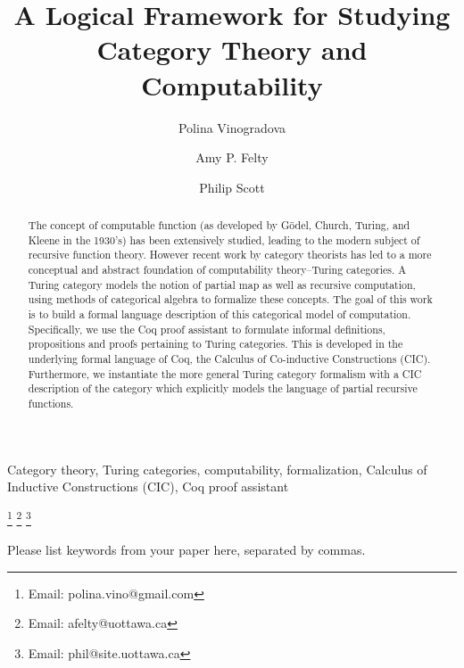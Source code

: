 \documentclass{entcs} \usepackage{entcsmacro}
\begin{document}
	\begin{frontmatter}
\title{A Logical Framework for Studying Category Theory and Computability}
\begin{keyword}
	Category theory, Turing categories, computability, formalization, Calculus of Inductive Constructions (CIC), Coq proof assistant
\end{keyword}		
		\author[CS]{Polina Vinogradova}
		\author[CS,Math]{Amy P. Felty}
		\author[Math,CS]{Philip Scott}
		\address[CS]{School of Electrical Engineering and Computer Science, University of Ottawa, Ottawa, Canada}
		\address[Math]{Department of Mathematics and Statistics, University of Ottawa, Ottawa, Canada}
		\thanks[emailpv]{Email: polina.vino@gmail.com}
		\thanks[emailaf]{Email: afelty@uottawa.ca}
		\thanks[emailps]{Email: phil@site.uottawa.ca}


\begin{abstract} 
The concept of computable function (as developed by G\"odel, Church, Turing, and Kleene
in the 1930's) has been extensively studied, leading to the modern subject of recursive function theory. However %
recent work by category theorists has led to a more conceptual and abstract foundation
of computability theory--Turing categories.
A Turing category models the notion of partial map as well as recursive computation,  using 
methods of categorical algebra to formalize these concepts. The goal of this work is to build a formal language description of this categorical model of computation. Specifically, we use the Coq proof assistant to formulate informal definitions, propositions and proofs pertaining to Turing categories.  This is developed in the underlying formal language of Coq, the Calculus of Co-inductive Constructions (CIC). Furthermore, we instantiate the more general Turing category formalism with a CIC description of the category which explicitly models the language of partial recursive functions.
\end{abstract}
\begin{keyword}
  Please list keywords from your paper here, separated by commas.
\end{keyword}
\end{frontmatter}
\end{document}
